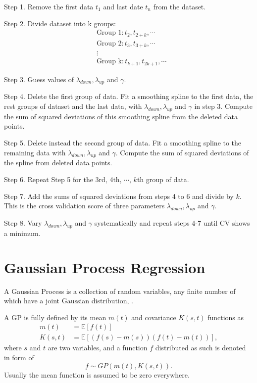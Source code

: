 Step 1. Remove the first data $t_1$ and last date $t_n$ from the dataset.

Step 2. Divide dataset into k groups:
\begin{align*}
& \mbox{Group 1}: t_2, t_{2+k}, \cdots \\
& \mbox{Group 2}: t_3, t_{3+k}, \cdots \\
& \vdots \\
& \mbox{Group k}: t_{k+1}, t_{2k+1}, \cdots
\end{align*}


Step 3. Guess values of $\lambda_{down}, \lambda_{up}$ and $\gamma$.

Step 4. Delete the first group of data. Fit a smoothing spline to the first data, the rest groups of dataset and the last data, with  $\lambda_{down}, \lambda_{up}$ and $\gamma$ in step 3. Compute the sum of squared deviations of this smoothing spline from the deleted data points.

Step 5. Delete instead the second group of data. Fit a smoothing spline to the remaining data with  $\lambda_{down}, \lambda_{up}$ and $\gamma$. Compute the sum of squared deviations of the spline from deleted data points.

Step 6. Repeat Step 5 for the 3rd, 4th, $\cdots$, $k$th group of data.

Step 7. Add the sums of squared deviations from steps 4 to 6 and divide by $k$. This is the cross validation score of three parameters  $\lambda_{down}, \lambda_{up}$ and $\gamma$.

Step 8. Vary  $\lambda_{down}, \lambda_{up}$ and $\gamma$ systematically and repeat steps 4-7 until CV shows a minimum.


\section{Gaussian Process Regression}

A Gaussian Process is a collection of random variables, any finite number of which have a joint Gaussian distribution, \cite{b_gpml}.

A GP is fully defined by its mean $m(t)$ and covariance $K(s,t)$ functions as
\begin{align}
m(t)&=\mathbb{E}[f(t)] \\
K(s,t)&=\mathbb{E}[(f(s)-m(s)) (f(t)-m(t))],
\end{align}
where $s$ and $t$ are two variables, and a function $f$ distributed as such is denoted in form of
\begin{equation}
f \sim GP(m(t),K(s,t)).
\end{equation}
Usually the mean function is assumed to be zero everywhere. 

